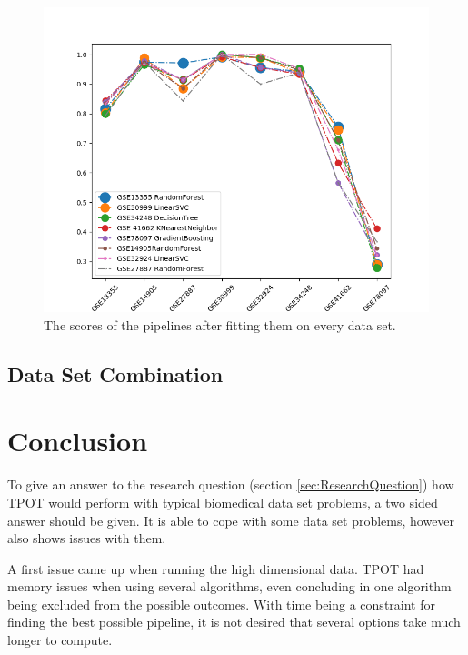 \documentclass[10pt,a4paper]{article}
\begin{document}
	\begin{figure}[h!]
		\includegraphics[scale=0.6]{DataPipelineScores.png}
		\caption{The scores of the pipelines after fitting them on every data set.}
		\label{fig:DataPipelineScores}
	\end{figure}

	\subsection{Data Set Combination}
	\label{subsec:ResultsDataSetCombination}
	
	\section{Conclusion}
	\label{sec:Conclusion}
	
	To give an answer to the research question (section \ref{sec:ResearchQuestion}) how TPOT would perform with typical biomedical data set problems, a two sided answer should be given. It is able to cope with some data set problems, however also shows issues with them.
	
	A first issue came up when running the high dimensional data. TPOT had memory issues when using several algorithms, even concluding in one algorithm being excluded from the possible outcomes. With time being a constraint for finding the best possible pipeline, it is not desired that several options take much longer to compute. 
	
	
\end{document}
